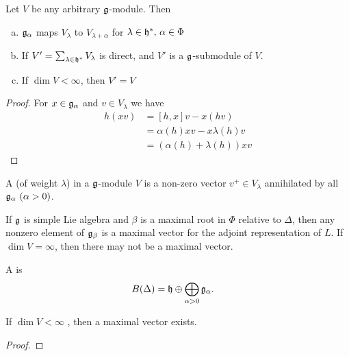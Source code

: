 \begin{lemma}
    Let $V$ be any arbitrary $\mathfrak{g}$-module. Then
    \begin{enumerate}[(a)]
        \makethislistcompact
        \item 
            $\mathfrak{g}_\alpha$ maps $V_\lambda$ to $V_{\lambda+\alpha}$ for $\lambda\in \mathfrak{h}^*,\,\alpha\in\Phi$
        \item 
            If $V'=\sum_{\lambda\in \mathfrak{h}^*} V_\lambda$ is direct, and $V'$ is a $\mathfrak{g}$-submodule of $V$.
        \item
            If $\dim V < \infty$, then $V'=V$
    \end{enumerate}
\end{lemma}
\begin{proof}
    For $x\in \mathfrak{g}_\alpha$ and $v\in V_\lambda$  we have
    \begin{align*}
        h(xv) &= [h,x]v - x(hv)\\
            &= \alpha(h)xv - x\lambda(h)v \\
            &= (\alpha(h) + \lambda(h)) xv
    \end{align*}
\end{proof}

A  (of weight $\lambda$) in a $\mathfrak{g}$-module $V$ is a non-zero vector $v^+\in V_\lambda$ annihilated by all $\mathfrak{g}_\alpha\ (\alpha > 0)$. 

\begin{insight}
    If $\mathfrak{g}$ is simple Lie algebra and $\beta$ is a maximal root in $\Phi$ relative to $\Delta$, then any nonzero element of $\mathfrak{g}_\beta$ is a maximal vector for the adjoint representation of $L$.
    If $\dim V = \infty$, then there may not be a maximal vector.
\end{insight}


A  is
\begin{align}
    B(\Delta) &= \mathfrak{h}\oplus \bigoplus_{\alpha>0} \mathfrak{g}_\alpha.
\end{align}
\begin{lemma}
    If $\dim V < \infty$ , then a maximal vector exists.
\end{lemma}
\begin{proof}
\end{proof}


